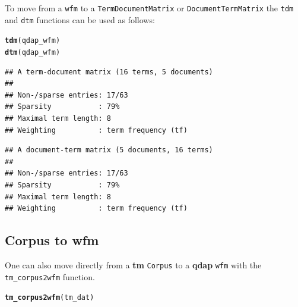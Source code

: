 \documentclass{article}\usepackage[]{graphicx}\usepackage[]{color}
\makeatletter
\newcommand{\hlstd}[1]{\textcolor[rgb]{0.345,0.345,0.345}{#1}}%
\newcommand{\hlkwd}[1]{\textcolor[rgb]{0.737,0.353,0.396}{\textbf{#1}}}%
\newenvironment{kframe}{%
 \def\at@end@of@kframe{}%
 \ifinner\ifhmode%
  \def\at@end@of@kframe{\end{minipage}}%
  \begin{minipage}{\columnwidth}%
 \fi\fi%
 \def\FrameCommand##1{\hskip\@totalleftmargin \hskip-\fboxsep
 \colorbox{shadecolor}{##1}\hskip-\fboxsep
     \hskip-\linewidth \hskip-\@totalleftmargin \hskip\columnwidth}%
 \MakeFramed {\advance\hsize-\width
   \@totalleftmargin\z@ \linewidth\hsize
   \@setminipage}}%
 {\par\unskip\endMakeFramed%
 \at@end@of@kframe}
\newenvironment{knitrout}{}{} %
\makeatother
\begin{document}
\hspace{.4cm} To move from a \texttt{wfm} to a \texttt{TermDocumentMatrix} or \texttt{DocumentTermMatrix} the \texttt{tdm} and \texttt{dtm} functions can be used as follows:

\begin{knitrout}
\color{fgcolor}\begin{kframe}
\begin{alltt}
\hlkwd{tdm}\hlstd{(qdap_wfm)}
\hlkwd{dtm}\hlstd{(qdap_wfm)}
\end{alltt}
\end{kframe}
\end{knitrout}


\begin{knitrout}
\color{fgcolor}\begin{kframe}
\begin{verbatim}
## A term-document matrix (16 terms, 5 documents)
## 
## Non-/sparse entries: 17/63
## Sparsity           : 79%
## Maximal term length: 8 
## Weighting          : term frequency (tf)
\end{verbatim}
\end{kframe}
\end{knitrout}


\begin{knitrout}
\color{fgcolor}\begin{kframe}
\begin{verbatim}
## A document-term matrix (5 documents, 16 terms)
## 
## Non-/sparse entries: 17/63
## Sparsity           : 79%
## Maximal term length: 8 
## Weighting          : term frequency (tf)
\end{verbatim}
\end{kframe}
\end{knitrout}


\subsection{Corpus to wfm}

\hspace{.4cm} One can also move directly from a \textbf{tm} \texttt{Corpus} to a \textbf{qdap} \texttt{wfm} with the \texttt{tm\_corpus2wfm} function.

\begin{knitrout}
\color{fgcolor}\begin{kframe}
\begin{alltt}
\hlkwd{tm_corpus2wfm}\hlstd{(tm_dat)}
\end{alltt}
\end{kframe}
\end{knitrout}
\end{document}
